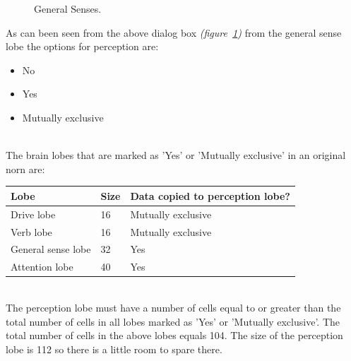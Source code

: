 \documentclass[11pt,twoside,a4paper]{article}
\begin{document}
\begin{minipage}[h]{9.75cm}
	\begin{figure}[H]
		\centerline {}
		\caption{General Senses. }
		\label{fig:gensense}
	\end{figure}
\end{minipage} \hfill \begin{minipage}[h]{9.50cm}
	As can been seen from the above dialog box \emph{(figure~\ref{fig:gensense})} from the general sense lobe the options for perception are:
	\begin{itemize}
		\item No
		\item Yes
		\item Mutually exclusive
	\end{itemize} ~\\
	
	The brain lobes that are marked as 'Yes' or 'Mutually exclusive' in an original norn are: ~\\
	\begin{tabular}[h]{|p{3.25cm}|p{0.75cm}|p{4.00cm}|}
		\hline
		\textbf{Lobe}		& 	\textbf{Size}	& 	\textbf{Data copied to \newline perception lobe?}	\\ \hline
		Drive lobe			&	16				&	Mutually exclusive									\\ \hline
		Verb lobe			&	16				&	Mutually exclusive									\\ \hline
		General sense lobe	&	32				&	Yes													\\ \hline
		Attention lobe		&	40				&	Yes													\\ \hline
	\end{tabular}
\end{minipage} ~\\

The perception lobe must have a number of cells equal to or greater than the total number of cells in all lobes marked as 'Yes' or 'Mutually exclusive'. The total number of cells in the above lobes equals 104. The size of the perception lobe is 112 so there is a little room to spare there. ~\\
\end{document}
